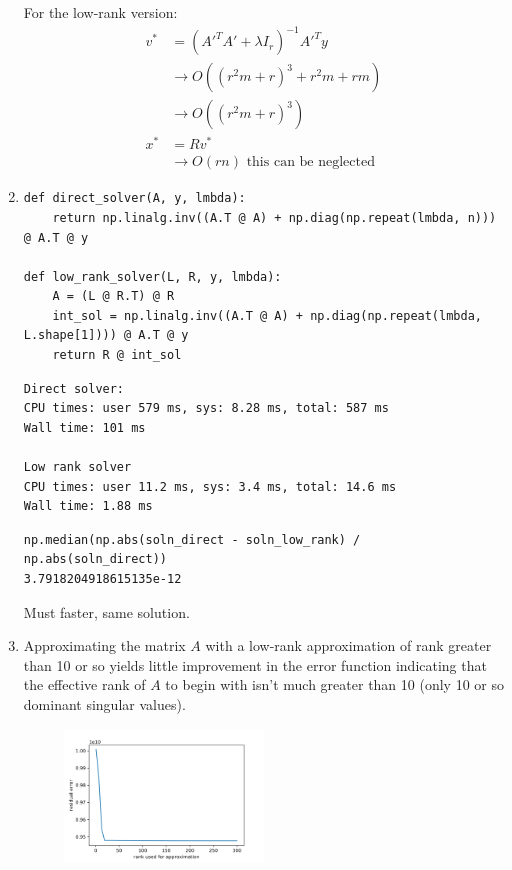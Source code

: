 \documentclass[11pt]{article}
\begin{document}
\begin{solution}
\begin{enumerate}
    For the low-rank version:
    \begin{align*}
        v^* &= (A'^T A' + \lambda I_r)^{-1} A'^T y \\
        &\rightarrow O((r^2 m + r)^3 + r^2 m + rm) \\
        &\rightarrow O((r^2 m + r)^3) \\
        x^* &= R v^* \\
        &\rightarrow O(rn) \text{ this can be neglected}
    \end{align*}

    \item
    \begin{verbatim}
def direct_solver(A, y, lmbda):
    return np.linalg.inv((A.T @ A) + np.diag(np.repeat(lmbda, n))) @ A.T @ y

def low_rank_solver(L, R, y, lmbda):
    A = (L @ R.T) @ R
    int_sol = np.linalg.inv((A.T @ A) + np.diag(np.repeat(lmbda, L.shape[1]))) @ A.T @ y
    return R @ int_sol
    \end{verbatim}

    \begin{verbatim}
Direct solver:
CPU times: user 579 ms, sys: 8.28 ms, total: 587 ms
Wall time: 101 ms

Low rank solver
CPU times: user 11.2 ms, sys: 3.4 ms, total: 14.6 ms
Wall time: 1.88 ms
    \end{verbatim}

    \begin{verbatim}
np.median(np.abs(soln_direct - soln_low_rank) / np.abs(soln_direct))
3.7918204918615135e-12
    \end{verbatim}

    Must faster, same solution.

    \item Approximating the matrix $A$ with a low-rank approximation of rank greater than 10 or so yields little improvement in the error function indicating that the effective rank of $A$ to begin with isn't much greater than 10 (only 10 or so dominant singular values).
    \begin{figure}[H]
        \centerline{\includegraphics[width=0.5\textwidth]{problem3_plot.png}}
    \end{figure}
\end{enumerate}
\end{solution}
\end{document}

